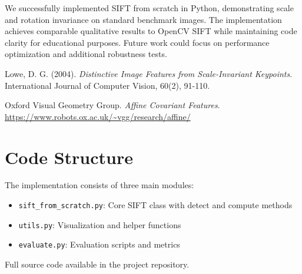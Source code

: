 \documentclass[11pt, a4paper]{article}
\begin{document}
We successfully implemented SIFT from scratch in Python, demonstrating scale and rotation invariance on standard benchmark images. The implementation achieves comparable qualitative results to OpenCV SIFT while maintaining code clarity for educational purposes. Future work could focus on performance optimization and additional robustness tests.

\begin{thebibliography}{9}
Lowe, D. G. (2004).
\textit{Distinctive Image Features from Scale-Invariant Keypoints}.
International Journal of Computer Vision, 60(2), 91-110.

Oxford Visual Geometry Group.
\textit{Affine Covariant Features}.
\url{https://www.robots.ox.ac.uk/~vgg/research/affine/}
\end{thebibliography}

\appendix
\section{Code Structure}

The implementation consists of three main modules:
\begin{itemize}
    \item \texttt{sift\_from\_scratch.py}: Core SIFT class with detect and compute methods
    \item \texttt{utils.py}: Visualization and helper functions
    \item \texttt{evaluate.py}: Evaluation scripts and metrics
\end{itemize}

Full source code available in the project repository.
\end{document}

